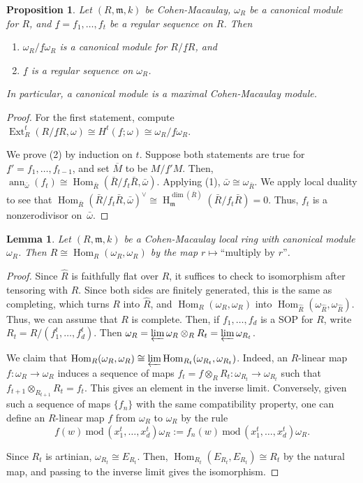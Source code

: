 \documentclass[11pt]{book}
\newtheorem{lemma}[theorem]{Lemma}
\newtheorem{proposition}[theorem]{Proposition}
\numberwithin{equation}{section}
\numberwithin{theorem}{chapter}
\theoremstyle{definition}
\newtheorem*{basic properties}{Basic Properties}
\newtheorem*{Important Remark}{Important Remark}
\theoremstyle{remark}
\newcommand{\m}{\mathfrak{m}}
\newcommand{\Hom}{\operatorname{Hom}}
\newcommand{\Ext}{\operatorname{Ext}}
\newcommand{\ann}{\operatorname{ann}}
\renewcommand{\dim}{\operatorname{dim}}
\renewcommand{\H}{\operatorname{H}}
\begin{document}
\begin{proposition}
	Let $(R,\m,k)$ be Cohen-Macaulay, $\omega_R$ be a canonical module for $R$, and $\underline{f}=f_1,\dots,f_t$ be a regular sequence on $R$. Then
	\begin{enumerate}
				\item $\omega_R / \underline{f} \omega_R$ is a canonical module for $R/\underline{f} R$, and
		\item $\underline{f}$ is a regular sequence on $\omega_R$.
	\end{enumerate}
In particular, a canonical module is a maximal Cohen-Macaulay module.
\end{proposition}
\begin{proof}
	For the first statement, compute $\Ext^t_R(R/\underline{f}R,\omega)\cong H^t(\underline{f};\omega)\cong \omega_R / \underline{f} \omega_R$.
	
	We prove (2)  by induction on $t$. Suppose both statements are true for $\underline{f}'=f_1,\dots,f_{t-1}$, and set $\overline{M}$ to be $M/\underline{f}' M$. Then, $\ann_{\bar{\omega}}(f_t)\cong \Hom_{\bar{R}}(\bar{R}/f_t \bar{R},\bar{\omega})$. Applying (1), $\bar{\omega}\cong \omega_{\bar{R}}$. We apply local duality to see that $\Hom_{\bar{R}}(\bar{R}/f_t \bar{R},\bar{\omega})^\vee\cong \H_\m^{\dim(\bar{R})}(\bar{R}/f_t \bar{R})=0$. Thus, $f_t$ is a nonzerodivisor on~$\bar{\omega}$. 
\end{proof}

\begin{lemma}
	Let $(R,\m,k)$ be a Cohen-Macaulay local ring with canonical module $\omega_R$. Then $R\cong \Hom_R(\omega_R,\omega_R)$ by the map $r \mapsto \text{``multiply by $r$''}$.
\end{lemma}
\begin{proof}
	Since $\widehat{R}$ is faithfully flat over $R$, it suffices to check to isomorphism after tensoring with $\widehat{R}$. Since both sides are finitely generated, this is the same as completing, which turns $R$ into $\widehat{R}$, and $\Hom_R(\omega_R,\omega_R)$ into $\Hom_{\widehat{R}}(\omega_{\widehat{R}},\omega_{\widehat{R}})$. Thus, we can assume that $R$ is complete. Then, if $f_1,\dots,f_d$ is a SOP for $R$, write $R_t=R/(f_1^t,\dots,f_d^t)$. Then $\omega_R=\varprojlim \omega_{R}\otimes_R R_t=\varprojlim \omega_{R_t}$. 
	
	We claim that $\Hom_R(\omega_R,\omega_R)\cong \varprojlim \Hom_{R_t}(\omega_{R_t},\omega_{R_t})$. Indeed, an $R$-linear map $f:\omega_R\to \omega_R$ induces a sequence of maps $f_t=f\otimes_R R_t: \omega_{R_t} \to \omega_{R_t}$ such that $f_{t+1} \otimes_{R_{t+1}} R_t = f_t$. This gives an element in the inverse limit. Conversely, given such a sequence of maps $\{f_n\}$ with the same compatibility property, one can define an $R$-linear map $f$ from $\omega_R$ to $\omega_R$ by the rule 
	\[f(w) \ \mathrm{mod} \,(x_1^t,\dots,x_d^t) \omega_R := f_n(w) \ \mathrm{mod} \, (x_1^t,\dots,x_d^t) \omega_R.\]
	
	Since $R_t$ is artinian, $\omega_{R_t}\cong E_{R_t}$. Then, $\Hom_{R_t}(E_{R_t},E_{R_t})\cong R_t$ by the natural map, and passing to the inverse limit gives the isomorphism.
\end{proof}
\end{document}
